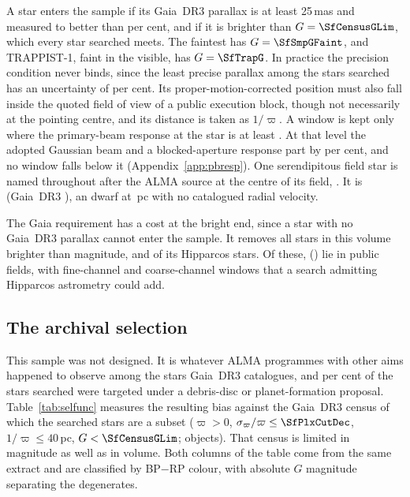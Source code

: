 A star enters the sample if its Gaia~DR3 parallax is at least 25\,mas and
measured to better than \PlxAdqlPct{} per cent, and if it is brighter than
$G=\SfCensusGLim$, which every star searched meets. The faintest has
$G=\SfSmpGFaint$, and TRAPPIST-1, faint in the visible, has $G=\SfTrapG$. In practice the precision condition
never binds, since the least precise parallax among the stars
searched has an uncertainty of \SfPlxWorstPct{} per cent.
Its proper-motion-corrected position must also fall inside the quoted field
of view of a public execution block, though not necessarily at the pointing
centre, and its distance is taken as $1/\varpi$. A window is kept only where
the primary-beam response at the star is at least \BmFloorResp. At that level
the adopted Gaussian beam and a blocked-aperture response part by
\BmFloorTolPct{} per cent, and no window falls below it
(Appendix~\ref{app:pbresp}). One serendipitous field star is named throughout
after the ALMA source at the centre of its field, \BkAlmaName. It is
\BkAlmaTwoMass{} (Gaia~DR3 \BkAlmaGaia), an \BkAlmaSpType{} dwarf at
\BkAlmaDistPc\,pc with no catalogued radial velocity.

The Gaia requirement has a cost at the bright end, since a star with no
Gaia~DR3 parallax cannot enter the sample. It removes all \BsNBright{} stars
in this volume brighter than \BsBrightMag{} magnitude, and \BsNGap{} of its
\BsNVol{} Hipparcos stars. Of these, \BsNAlmaWord{} (\BsStarList) lie in
public fields, with \BsNWinA{} fine-channel and \BsNWinB{} coarse-channel
windows that a search admitting Hipparcos astrometry could add.


\subsection{The archival selection}
\label{sec:bias}

This sample was not designed. It is whatever ALMA programmes with other aims
happened to observe among the stars Gaia~DR3 catalogues, and
\PctDiscProposal{} per cent of the stars searched were targeted under a
debris-disc or planet-formation proposal. Table~\ref{tab:selfunc} measures the
resulting bias against the Gaia~DR3 census of which the searched stars are a
subset ($\varpi>0$, $\sigma_\varpi/\varpi\le\SfPlxCutDec$,
$1/\varpi\le40$\,pc, $G<\SfCensusGLim$; \SfCensusN{} objects). That census
is limited in magnitude as well as in volume. Both columns of the table come
from the same extract and are classified by BP$-$RP colour, with absolute $G$ magnitude separating the degenerates.

